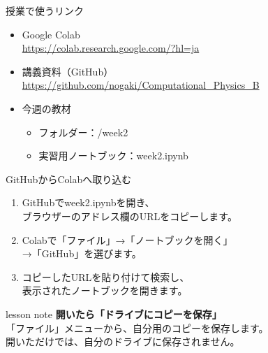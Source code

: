 \documentclass[12pt,aspectratio=43]{beamer}
\newcommand{\code}[1]{{\codefont #1}}
\newenvironment{lessonbox}
  {\begin{beamercolorbox}[wd=\linewidth,sep=1.5mm]{lesson note}}
  {\end{beamercolorbox}\par}
\begin{document}
\begin{frame}{授業で使うリンク}
  \begin{itemize}
    \setlength{\itemsep}{6mm}
    \item Google Colab\\
      {\small\url{https://colab.research.google.com/?hl=ja}}
    \item 講義資料（GitHub）\\
      {\small\url{https://github.com/nogaki/Computational_Physics_B}}
    \item 今週の教材
      \begin{itemize}
        \item フォルダー：\code{2026/week2}
        \item 実習用ノートブック：\code{week2.ipynb}
      \end{itemize}
  \end{itemize}
\end{frame}

\begin{frame}[t]{GitHubからColabへ取り込む}
  \setlength{\parskip}{0pt}
  \begin{enumerate}
    \setlength{\itemsep}{4mm}
    \item GitHubで\code{week2.ipynb}を開き、\\
      ブラウザーのアドレス欄のURLをコピーします。
    \item Colabで「ファイル」→「ノートブックを開く」\\
      →「GitHub」を選びます。
    \item コピーしたURLを貼り付けて検索し、\\
      表示されたノートブックを開きます。
  \end{enumerate}
  \vspace{3mm}
  \begin{lessonbox}
    \textbf{開いたら「ドライブにコピーを保存」}\\[1mm]
    \small 「ファイル」メニューから、自分用のコピーを保存します。\\
    開いただけでは、自分のドライブに保存されません。
  \end{lessonbox}
\end{frame}
\end{document}
